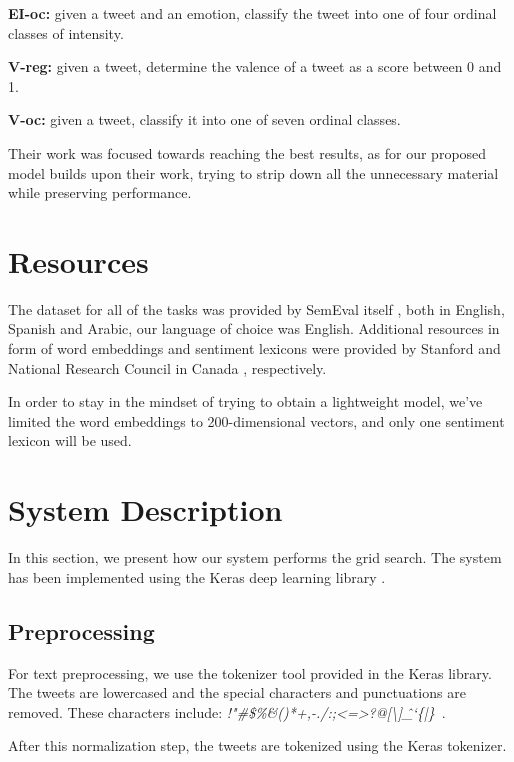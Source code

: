 \documentclass[10pt, a4paper]{article}
\begin{document}
\textbf{EI-oc:} given a tweet and an emotion, classify the tweet into one of four ordinal classes of intensity.

\textbf{V-reg:} given a tweet, determine the valence of a tweet as a score between 0 and 1.

\textbf{V-oc:} given a tweet, classify it into one of seven ordinal classes.


Their work was focused towards reaching the best results, as for our proposed model builds upon their work, trying to strip down all the unnecessary material while preserving performance.

\section{Resources}
The dataset for all of the tasks was provided by SemEval itself \citep{mohammed-semeval}, both in English, Spanish and Arabic, our language of choice was English. Additional resources in form of word embeddings and sentiment lexicons were provided by Stanford \citep{glove} and National Research Council in Canada \citep{nrcic}, respectively. 

In order to stay in the mindset of trying to obtain a lightweight model, we've limited the word embeddings to 200-dimensional vectors, and only one sentiment lexicon will be used.


\section{System Description}
In this section, we present how our system performs the grid search.
The system has been implemented using the Keras deep learning library \citep{chollet2015keras}.

\subsection{Preprocessing}
For text preprocessing, we use the tokenizer tool provided in the Keras library.
The tweets are lowercased and the special characters and
punctuations are removed.
These characters include: \textit{!"#\$\%&()*+,-./:;<=>?@[\textbackslash]\^\_`\{|\}~}.

After this normalization step, the tweets are tokenized using the Keras tokenizer.
\end{document}
